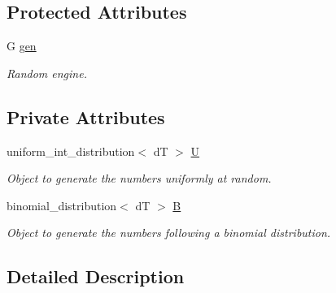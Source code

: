\subsection*{Protected Attributes}
\begin{DoxyCompactItemize}
\item 
G \hyperlink{classlgraph_1_1utils_1_1random__generator_a18353876b4c2d3a18aee454b5750a0a0}{gen}\hypertarget{classlgraph_1_1utils_1_1random__generator_a18353876b4c2d3a18aee454b5750a0a0}{}\label{classlgraph_1_1utils_1_1random__generator_a18353876b4c2d3a18aee454b5750a0a0}

\begin{DoxyCompactList}\small\item\em Random engine. \end{DoxyCompactList}\end{DoxyCompactItemize}
\subsection*{Private Attributes}
\begin{DoxyCompactItemize}
\item 
uniform\+\_\+int\+\_\+distribution$<$ dT $>$ \hyperlink{classlgraph_1_1utils_1_1drandom__generator_a6949a3bf302e877b8898baa2a0da6bba}{U}\hypertarget{classlgraph_1_1utils_1_1drandom__generator_a6949a3bf302e877b8898baa2a0da6bba}{}\label{classlgraph_1_1utils_1_1drandom__generator_a6949a3bf302e877b8898baa2a0da6bba}

\begin{DoxyCompactList}\small\item\em Object to generate the numbers uniformly at random. \end{DoxyCompactList}\item 
binomial\+\_\+distribution$<$ dT $>$ \hyperlink{classlgraph_1_1utils_1_1drandom__generator_a9cacdee7725cd90b02d5d1b9bdc1e5d1}{B}\hypertarget{classlgraph_1_1utils_1_1drandom__generator_a9cacdee7725cd90b02d5d1b9bdc1e5d1}{}\label{classlgraph_1_1utils_1_1drandom__generator_a9cacdee7725cd90b02d5d1b9bdc1e5d1}

\begin{DoxyCompactList}\small\item\em Object to generate the numbers following a binomial distribution. \end{DoxyCompactList}\end{DoxyCompactItemize}


\subsection{Detailed Description}
